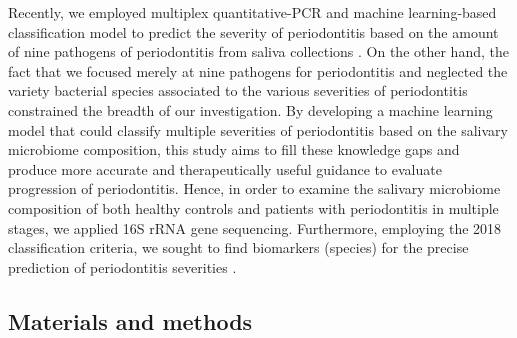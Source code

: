 \documentclass[11pt, a4paper, onecolumn, oneside]{report}
\begin{document}
            Recently, we employed multiplex quantitative-PCR and machine learning-based classification model to predict the severity of periodontitis based on the amount of nine pathogens of periodontitis from saliva collections \cite{Periodontitis-diagnosis-8}. On the other hand, the fact that we focused merely at nine pathogens for periodontitis and neglected the variety bacterial species associated to the various severities of periodontitis constrained the breadth of our investigation. By developing a machine learning model that could classify multiple severities of periodontitis based on the salivary microbiome composition, this study aims to fill these knowledge gaps and produce more accurate and therapeutically useful guidance to evaluate progression of periodontitis. Hence, in order to examine the salivary microbiome composition of both healthy controls and patients with periodontitis in multiple stages, we applied 16S rRNA gene sequencing. Furthermore, employing the 2018 classification criteria, we sought to find biomarkers (species) for the precise prediction of periodontitis severities \cite{Periodontitis-4, Periodontitis-13}.
        \newpage

        \subsection{Materials and methods}
\end{document}
